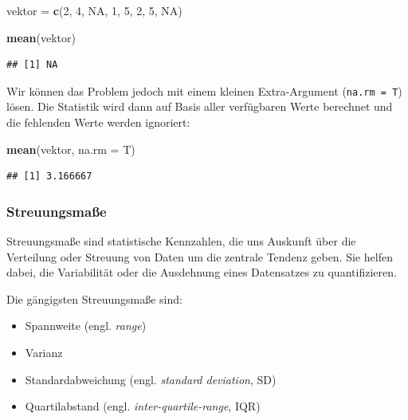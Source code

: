 \documentclass[
]{book}
\newenvironment{Shaded}{\begin{snugshade}}{\end{snugshade}}
\newcommand{\AttributeTok}[1]{\textcolor[rgb]{0.13,0.29,0.53}{#1}}
\newcommand{\ConstantTok}[1]{\textcolor[rgb]{0.56,0.35,0.01}{#1}}
\newcommand{\DecValTok}[1]{\textcolor[rgb]{0.00,0.00,0.81}{#1}}
\newcommand{\FunctionTok}[1]{\textcolor[rgb]{0.13,0.29,0.53}{\textbf{#1}}}
\newcommand{\NormalTok}[1]{#1}
\newcommand{\OtherTok}[1]{\textcolor[rgb]{0.56,0.35,0.01}{#1}}
\providecommand{\tightlist}{%
  \setlength{\itemsep}{0pt}\setlength{\parskip}{0pt}}
\begin{document}
\begin{Shaded}
\begin{Highlighting}[]
\NormalTok{vektor }\OtherTok{=} \FunctionTok{c}\NormalTok{(}\DecValTok{2}\NormalTok{, }\DecValTok{4}\NormalTok{, }\ConstantTok{NA}\NormalTok{, }\DecValTok{1}\NormalTok{, }\DecValTok{5}\NormalTok{, }\DecValTok{2}\NormalTok{, }\DecValTok{5}\NormalTok{, }\ConstantTok{NA}\NormalTok{)}

\FunctionTok{mean}\NormalTok{(vektor)}
\end{Highlighting}
\end{Shaded}

\begin{verbatim}
## [1] NA
\end{verbatim}

Wir können das Problem jedoch mit einem kleinen Extra-Argument (\texttt{na.rm\ =\ T}) lösen. Die Statistik wird dann auf Basis aller verfügbaren Werte berechnet und die fehlenden Werte werden ignoriert:

\begin{Shaded}
\begin{Highlighting}[]
\FunctionTok{mean}\NormalTok{(vektor, }\AttributeTok{na.rm =}\NormalTok{ T)}
\end{Highlighting}
\end{Shaded}

\begin{verbatim}
## [1] 3.166667
\end{verbatim}

\subsubsection{Streuungsmaße}\label{streuungsmauxdfe}

Streuungsmaße sind statistische Kennzahlen, die uns Auskunft über die Verteilung oder Streuung von Daten um die zentrale Tendenz geben. Sie helfen dabei, die Variabilität oder die Ausdehnung eines Datensatzes zu quantifizieren.

Die gängigsten Streuungsmaße sind:

\begin{itemize}
\tightlist
\item
  Spannweite (engl. \emph{range})
\item
  Varianz
\item
  Standardabweichung (engl. \emph{standard deviation}, SD)
\item
  Quartilabstand (engl. \emph{inter-quartile-range}, IQR)
\end{itemize}
\end{document}
